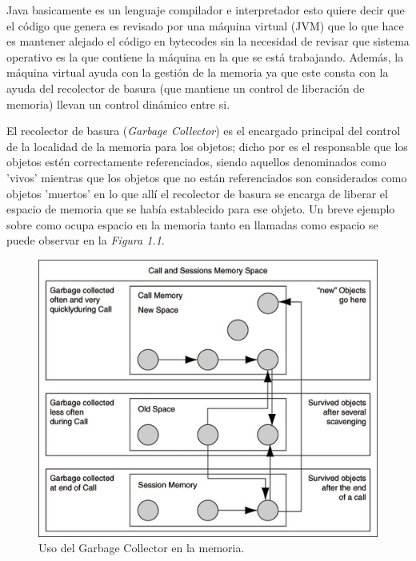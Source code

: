 \documentclass[12pt]{book} %
\begin{document}
Java basicamente es un lenguaje compilador e interpretador \cite{ob} esto quiere decir que el código que genera es revisado por una máquina virtual (JVM) que lo que hace es mantener alejado el código en bytecodes sin la necesidad de revisar que sistema operativo es la que contiene la máquina en la que se está trabajando. Además, la máquina virtual ayuda con la gestión de la memoria ya que este consta con la ayuda del recolector de basura (que mantiene un control de liberación de memoria) llevan un control dinámico entre si.

El recolector de basura (\textsl{Garbage Collector}) es el encargado principal del control de la localidad de la memoria para los objetos; dicho por \cite{sun} es el responsable que los objetos estén correctamente referenciados, siendo aquellos denominados como 'vivos' mientras que los objetos que no están referenciados son considerados como objetos 'muertos' en lo que allí el recolector de basura se encarga de liberar el espacio de memoria que se había establecido para ese objeto. Un breve ejemplo sobre como ocupa espacio en la memoria tanto en llamadas como espacio se puede observar en la \textsl{Figura 1.1}.

\begin{figure}[h!]
	\begin{center}
	\includegraphics[scale=0.5]{garbage.jpg}
	\end{center}
	\caption{Uso del Garbage Collector en la memoria.}
\end{figure}~\\[2cm]
\end{document}
